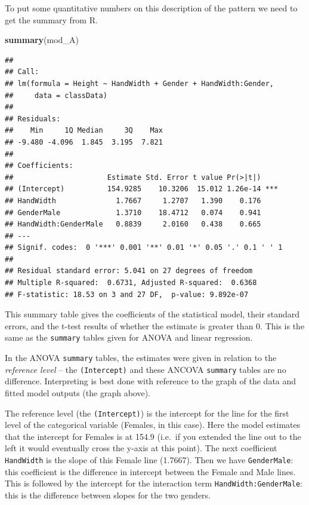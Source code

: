 \documentclass[
  a4paperpaper,
]{book}
\newenvironment{Shaded}{\begin{snugshade}}{\end{snugshade}}
\newcommand{\KeywordTok}[1]{\textcolor[rgb]{0.13,0.29,0.53}{\textbf{#1}}}
\newcommand{\NormalTok}[1]{#1}
\begin{document}
To put some quantitative numbers on this description of the pattern we need to get the summary from R.

\begin{Shaded}
\begin{Highlighting}[]
\KeywordTok{summary}\NormalTok{(mod\_A)}
\end{Highlighting}
\end{Shaded}

\begin{verbatim}
## 
## Call:
## lm(formula = Height ~ HandWidth + Gender + HandWidth:Gender, 
##     data = classData)
## 
## Residuals:
##    Min     1Q Median     3Q    Max 
## -9.480 -4.096  1.845  3.195  7.821 
## 
## Coefficients:
##                      Estimate Std. Error t value Pr(>|t|)    
## (Intercept)          154.9285    10.3206  15.012 1.26e-14 ***
## HandWidth              1.7667     1.2707   1.390    0.176    
## GenderMale             1.3710    18.4712   0.074    0.941    
## HandWidth:GenderMale   0.8839     2.0160   0.438    0.665    
## ---
## Signif. codes:  0 '***' 0.001 '**' 0.01 '*' 0.05 '.' 0.1 ' ' 1
## 
## Residual standard error: 5.041 on 27 degrees of freedom
## Multiple R-squared:  0.6731,	Adjusted R-squared:  0.6368 
## F-statistic: 18.53 on 3 and 27 DF,  p-value: 9.892e-07
\end{verbatim}

This summary table gives the coefficients of the statistical model, their standard errors, and the t-test results of whether the estimate is greater than 0. This is the same as the \texttt{summary} tables given for ANOVA and linear regression.

In the ANOVA \texttt{summary} tables, the estimates were given in relation to the \emph{reference level} -- the \texttt{(Intercept)} and these ANCOVA \texttt{summary} tables are no difference. Interpreting is best done with reference to the graph of the data and fitted model outputs (the graph above).

The reference level (the \texttt{(Intercept)}) is the intercept for the line for the first level of the categorical variable (Females, in this case). Here the model estimates that the intercept for Females is at 154.9 (i.e.~if you extended the line out to the left it would eventually cross the y-axis at this point). The next coefficient \texttt{HandWidth} is the slope of this Female line (1.7667). Then we have \texttt{GenderMale}: this coefficient is the difference in intercept between the Female and Male lines. This is followed by the intercept for the interaction term \texttt{HandWidth:GenderMale}: this is the difference between slopes for the two genders.
\end{document}
